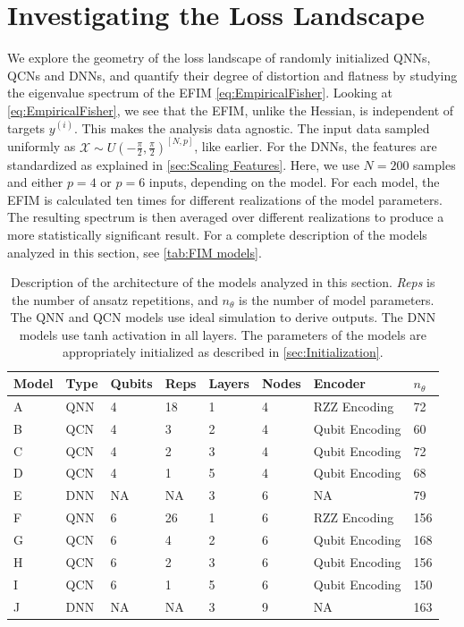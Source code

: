 \section{Investigating the Loss Landscape}\label{sec:Investigating the Loss Landscape}
We explore the geometry of the loss landscape of randomly initialized QNNs, QCNs and DNNs, and quantify their degree of distortion and flatness by studying the eigenvalue spectrum of the EFIM \autoref{eq:EmpiricalFisher}. Looking at \autoref{eq:EmpiricalFisher}, we see that the EFIM, unlike the Hessian, is independent of targets $y^{(i)}$. This makes the analysis data agnostic. The input data sampled uniformly as $\mathcal{X} \sim U(-\frac{\pi}{2}, \frac{\pi}{2})^{[N,p]}$, like earlier. For the DNNs, the features are standardized as explained in \autoref{sec:Scaling Features}. Here, we use $N=200$ samples and either $p=4$ or $p=6$ inputs, depending on the model. For each model, the EFIM is calculated ten times for different realizations of the model parameters. The resulting spectrum is then averaged over different realizations to produce a more statistically significant result. For a complete description of the models analyzed in this section, see \autoref{tab:FIM models}.

\begin{table}[H]
\caption{Description of the architecture of the models analyzed in this section. \emph{Reps} is the number of ansatz repetitions, and $n_{\theta}$ is the number of model parameters. The QNN and QCN models use ideal simulation to derive outputs. The DNN models use tanh activation in all layers. The parameters of the models are appropriately initialized as described in \autoref{sec:Initialization}.} 
\centering
\begin{tabular}{|l|l|l|l|l|l|l|l|}
\hline
Model &Type & Qubits& Reps & Layers & Nodes & Encoder        & $n_{\theta}$ \\ \hline
A    & QNN & 4& 18   & 1      & 4     & RZZ Encoding   & 72  \\ \hline
B    & QCN & 4& 3    & 2      & 4     & Qubit Encoding & 60 \\ \hline
C    & QCN & 4& 2    & 3      & 4     & Qubit Encoding & 72  \\ \hline
D    & QCN & 4& 1    & 5      & 4     & Qubit Encoding & 68  \\ \hline
E    & DNN & NA& NA   & 3      & 6     & NA             & 79 \\ \hline
F    & QNN & 6& 26   & 1      & 6     & RZZ Encoding   & 156  \\ \hline
G    & QCN & 6& 4    & 2      & 6     & Qubit Encoding & 168 \\ \hline
H    & QCN & 6& 2    & 3      & 6     & Qubit Encoding & 156  \\ \hline
I    & QCN & 6& 1    & 5      & 6     & Qubit Encoding & 150  \\ \hline
J    & DNN & NA& NA   & 3      & 9     & NA             & 163 \\ \hline
\end{tabular}
\label{tab:FIM models}
\end{table}

